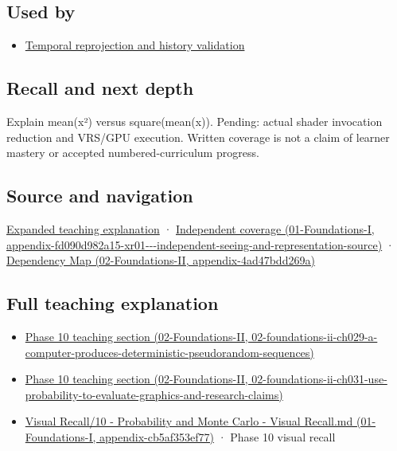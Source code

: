 \subsection{Used by}\label{appendix-4192b2bdd21e-used-by}

\begin{itemize}
\tightlist
\item
  \hyperref[appendix-0727340a4428]{Temporal reprojection and history validation}
\end{itemize}

\subsection{Recall and next depth}\label{appendix-4192b2bdd21e-recall-and-next-depth}

Explain mean(x²) versus square(mean(x)). Pending: actual shader invocation reduction and VRS/GPU execution. Written coverage is not a claim of learner mastery or accepted numbered-curriculum progress.

\subsection{Source and navigation}\label{appendix-4192b2bdd21e-source-and-navigation}

\href{Continuous\%20Notes/University\%20-\%20Worlds,\%20Images\%20and\%20Inference\%20-\%20Graphics,\%20Vision\%20and\%20Photography\#Multiresolution\%20work\%20must\%20preserve\%20the\%20right\%20information}{Expanded teaching explanation} · \href{../01-Foundations-I/main.pdf\#nameddest=appendix-fd090d982a15-xr01---independent-seeing-and-representation-source}{Independent coverage (01-Foundations-I, appendix-fd090d982a15-xr01-\/-\/-independent-seeing-and-representation-source)} · \href{../02-Foundations-II/main.pdf\#nameddest=appendix-4ad47bdd269a}{Dependency Map (02-Foundations-II, appendix-4ad47bdd269a)}

\subsection{Full teaching explanation}\label{appendix-4192b2bdd21e-full-teaching-explanation}

\begin{itemize}
\tightlist
\item
  \href{../02-Foundations-II/main.pdf\#nameddest=02-foundations-ii-ch029-a-computer-produces-deterministic-pseudorandom-sequences}{Phase 10 teaching section (02-Foundations-II, 02-foundations-ii-ch029-a-computer-produces-deterministic-pseudorandom-sequences)}
\item
  \href{../02-Foundations-II/main.pdf\#nameddest=02-foundations-ii-ch031-use-probability-to-evaluate-graphics-and-research-claims}{Phase 10 teaching section (02-Foundations-II, 02-foundations-ii-ch031-use-probability-to-evaluate-graphics-and-research-claims)}
\item
  \href{../01-Foundations-I/main.pdf\#nameddest=appendix-cb5af353ef77}{Visual Recall/10 - Probability and Monte Carlo - Visual Recall.md (01-Foundations-I, appendix-cb5af353ef77)} · Phase 10 visual recall
\end{itemize}
